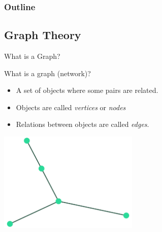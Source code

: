\documentclass[unknownkeysallowed]{beamer}
\begin{document}
\begin{frame}
  \frametitle{Outline}
  \tableofcontents[currentsection]
\end{frame}

\subsection{Graph Theory}

\begin{frame}{What is a Graph?}

What is a graph (network)?

  \begin{itemize}
    \pause
  \item A set of objects where some pairs are related.
    \pause
  \item Objects are called {\it vertices} or {\it nodes}
    \pause
  \item Relations between objects are called {\it edges}. 
  \end{itemize}
  \pause
  \centering
  \includegraphics[width=0.5\textwidth]{assets/mini-tree}

\end{frame}
\end{document}
